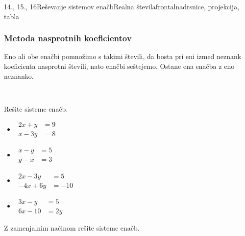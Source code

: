 \begin{priprava}{14., 15., 16}{}{Reševanje sistemov enačb}{Realna števila}{frontalna}{drsnice, projekcija, tabla}
            \subsubsection*{Metoda nasprotnih koeficientov}
                Eno ali obe enačbi pomnožimo s takimi števili, da bosta pri eni izmed neznank koeficienta nasprotni števili, nato enačbi seštejemo.
                Ostane ena enačba z eno neznanko.
            

~~~\\
        


            \begin{naloga}
                Rešite sisteme enačb.
                \begin{multicols}{2}

                \begin{itemize}
                    
                        \item $\begin{aligned}
                            2x+y&=9 \\ x-3y&=8
                        \end{aligned}$ 
                        \item $\begin{aligned}
                            x-y&=5 \\ y-x&=3
                        \end{aligned}$ 
                        \item $\begin{aligned}
                            2x-3y&=5 \\ -4x+6y&=-10
                        \end{aligned}$ 
                        \item $\begin{aligned}
                            3x-y&=5 \\ 6x-10&=2y
                        \end{aligned}$ 
                    

                \end{itemize}
            \end{multicols}

            \end{naloga}
        


        
            \begin{naloga}
                Z zamenjalnim načinom rešite sisteme enačb.
                \begin{multicols}{2}


\end{multicols}
\end{naloga}
\end{priprava}
